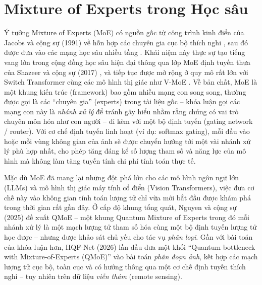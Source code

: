 \section{Mixture of Experts trong Học sâu}
Ý tưởng Mixture of Experts (MoE) có nguồn gốc từ công trình kinh điển của Jacobs và cộng sự (1991) về hỗn hợp các chuyên gia cục bộ thích nghi \cite{jacobs1991moe}, sau đó được đưa vào các mạng học sâu nhiều tầng \cite{eigen2013moe}. Khái niệm này thực sự tạo tiếng vang lớn trong cộng đồng học sâu hiện đại thông qua lớp MoE định tuyến thưa của Shazeer và cộng sự (2017) \cite{shazeer2017moe}, và tiếp tục được mở rộng ở quy mô rất lớn với Switch Transformer \cite{fedus2022switch} cùng các mô hình thị giác như V-MoE \cite{riquelme2021vmoe}. Về bản chất, MoE là một khung kiến trúc (framework) bao gồm nhiều mạng con song song, thường được gọi là các ``chuyên gia'' (experts) trong tài liệu gốc -- khóa luận gọi các mạng con này là \emph{nhánh xử lý} để tránh gây hiểu nhầm rằng chúng có vai trò chuyên môn hóa như con người -- đi kèm với một bộ định tuyến (gating network / router). Với cơ chế định tuyến linh hoạt (ví dụ: softmax gating), mỗi đầu vào hoặc mỗi vùng không gian của ảnh sẽ được chuyển hướng tới một vài nhánh xử lý phù hợp nhất, cho phép tăng đáng kể số lượng tham số và năng lực của mô hình mà không làm tăng tuyến tính chi phí tính toán thực tế.

Mặc dù MoE đã mang lại những đột phá lớn cho các mô hình ngôn ngữ lớn (LLMs) và mô hình thị giác máy tính cổ điển (Vision Transformers), việc đưa cơ chế này vào không gian tính toán lượng tử chỉ vừa mới bắt đầu được khám phá trong thời gian rất gần đây. Ở cấp độ khung tổng quát, Nguyen và cộng sự (2025) đề xuất QMoE \cite{nguyen2025qmoe} -- một khung Quantum Mixture of Experts trong đó mỗi nhánh xử lý là một mạch lượng tử tham số hóa cùng một bộ định tuyến lượng tử học được -- nhưng được khảo sát chủ yếu cho tác vụ \emph{phân loại}. Gần với bài toán của khóa luận hơn, HQF-Net (2026) \cite{hossain2026hqfnet} lần đầu đưa một khối ``Quantum bottleneck with Mixture-of-Experts (QMoE)'' vào bài toán \emph{phân đoạn ảnh}, kết hợp các mạch lượng tử cục bộ, toàn cục và có hướng thông qua một cơ chế định tuyến thích nghi -- tuy nhiên trên dữ liệu \emph{viễn thám} (remote sensing).

